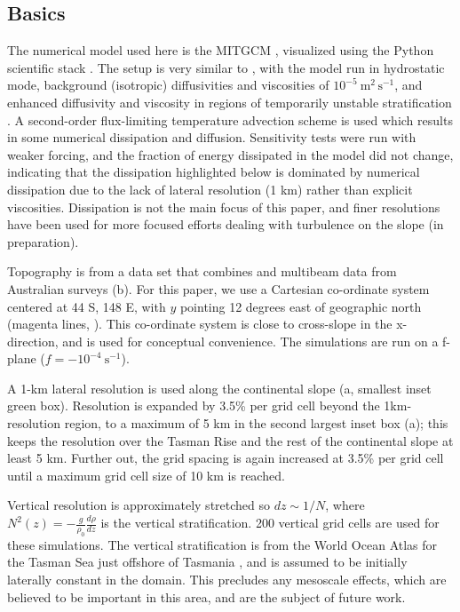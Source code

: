\documentclass[12pt]{article}
\begin{document}
\subsection{Basics}

The numerical model used here is the MITGCM \citep{marshalletal97}, visualized using the Python scientific stack \citep{hunter07,vanderwaltetal11}. The setup is very similar to \citet{buijsmanetal14}, with the model run in hydrostatic mode, background (isotropic) diffusivities and viscosities of $10^{-5}\ \mathrm{m^2\,s^{-1}}$, and enhanced diffusivity and viscosity in regions of temporarily unstable stratification \citep{klymaklegg10}.  A second-order flux-limiting temperature advection scheme is used which results in some numerical dissipation and diffusion.  Sensitivity tests were run with weaker forcing, and the fraction of energy dissipated in the model did not change, indicating that the dissipation highlighted below is dominated by numerical dissipation due to the lack of lateral resolution (1 km) rather than explicit viscosities. Dissipation is not the main focus of this paper, and finer resolutions have been used for more focused efforts dealing with turbulence on the slope (in preparation).  

Topography is from a data set that combines \citet{smithsandwell97} and multibeam data from Australian surveys \citep{Whiteway09a} (b).  For this paper, we use a Cartesian co-ordinate system centered at 44 S, 148 E, with $y$ pointing 12 degrees east of geographic north (magenta lines, ).  This co-ordinate system is close to cross-slope in the x-direction, and is used for conceptual convenience.  The simulations are run on a f-plane ($f=-10^{-4}\ \mathrm{s^{-1}}$).  

A 1-km lateral resolution is used along the continental slope (a, smallest inset green box).  Resolution is expanded by 3.5\% per grid cell beyond the 1km-resolution region, to a maximum of 5 km in the second largest inset box (a); this keeps the resolution over the Tasman Rise and the rest of the continental slope at least 5 km.  Further out, the grid spacing is again increased at 3.5\% per grid cell until a maximum grid cell size of 10 km is reached.  

Vertical resolution is approximately stretched so $dz\sim 1/N$, where $N^2(z)=-\frac{g}{\rho_0}\frac{d\rho}{dz}$ is the vertical stratification.  200 vertical grid cells are used for these simulations. The vertical stratification is from the World Ocean Atlas for the Tasman Sea just offshore of Tasmania \citep[c][]{woa13}, and is assumed to be initially laterally constant in the domain.  This precludes any mesoscale effects, which are believed to be important in this area, and are the subject of future work.
\end{document}

